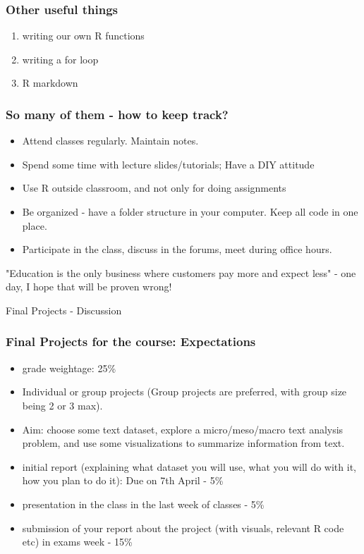 \documentclass{beamer}
\begin{document}
\begin{frame}
\frametitle{Other useful things}
\begin{enumerate}
\item writing our own R functions
\item writing a for loop
\item R markdown
\end{enumerate}
\end{frame}

\begin{frame}
\frametitle{So many of them - how to keep track?}
\begin{itemize}
\item Attend classes regularly. Maintain notes.
\item Spend some time with lecture slides/tutorials; Have a DIY attitude
\item Use R outside classroom, and not only for doing assignments
\item Be organized - have a folder structure in your computer. Keep all code in one place.
\item Participate in the class, discuss in the forums, meet during office hours.
\end{itemize}
\pause "Education is the only business where customers pay more and expect less" - one day, I hope that will be proven wrong!
\end{frame}

\begin{frame}
\centering
\Large Final Projects - Discussion
\end{frame}

\begin{frame}
\frametitle{Final Projects for the course: Expectations}
\begin{itemize}
\item grade weightage: 25\%
\item Individual or group projects (Group projects are preferred, with group size being 2 or 3 max).
\item Aim: choose some text dataset, explore a micro/meso/macro text analysis problem, and use some visualizations to summarize information from text.
\item initial report (explaining what dataset you will use, what you will do with it, how you plan to do it): Due on 7th April - 5\%
\item presentation in the class in the last week of classes - 5\%
\item submission of your report about the project (with visuals, relevant R code etc) in exams week - 15\%
\end{itemize}
\end{frame}
\end{document}
